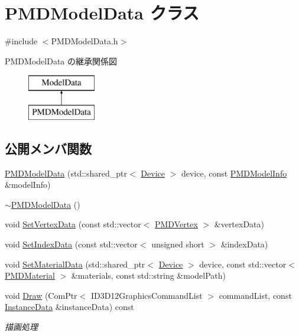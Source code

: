 \hypertarget{class_p_m_d_model_data}{}\section{P\+M\+D\+Model\+Data クラス}
\label{class_p_m_d_model_data}


{\ttfamily \#include $<$P\+M\+D\+Model\+Data.\+h$>$}

P\+M\+D\+Model\+Data の継承関係図\begin{figure}[H]
\begin{center}
\leavevmode
\includegraphics[height=2.000000cm]{class_p_m_d_model_data}
\end{center}
\end{figure}
\subsection*{公開メンバ関数}
\begin{DoxyCompactItemize}
\item 
\mbox{\hyperlink{class_p_m_d_model_data_a75af9f2a3f48724d2c4670cc4c117a0f}{P\+M\+D\+Model\+Data}} (std\+::shared\+\_\+ptr$<$ \mbox{\hyperlink{class_device}{Device}} $>$ device, const \mbox{\hyperlink{struct_p_m_d_model_info}{P\+M\+D\+Model\+Info}} \&model\+Info)
\item 
\mbox{\hyperlink{class_p_m_d_model_data_a5cc7bb8b8046d533f3d38f5e056cf627}{$\sim$\+P\+M\+D\+Model\+Data}} ()
\item 
void \mbox{\hyperlink{class_p_m_d_model_data_a7c3e55a09f65738c2117bdd7bb71b058}{Set\+Vertex\+Data}} (const std\+::vector$<$ \mbox{\hyperlink{struct_p_m_d_vertex}{P\+M\+D\+Vertex}} $>$ \&vertex\+Data)
\item 
void \mbox{\hyperlink{class_p_m_d_model_data_a120b4a461669a4bb68210602b17425f1}{Set\+Index\+Data}} (const std\+::vector$<$ unsigned short $>$ \&index\+Data)
\item 
void \mbox{\hyperlink{class_p_m_d_model_data_a83a950e111380bb2a28ecab045e5c3b4}{Set\+Material\+Data}} (std\+::shared\+\_\+ptr$<$ \mbox{\hyperlink{class_device}{Device}} $>$ device, const std\+::vector$<$ \mbox{\hyperlink{struct_p_m_d_material}{P\+M\+D\+Material}} $>$ \&materials, const std\+::string \&model\+Path)
\item 
void \mbox{\hyperlink{class_p_m_d_model_data_ae811d49854ae659f20ac9be60a5fb146}{Draw}} (Com\+Ptr$<$ I\+D3\+D12\+Graphics\+Command\+List $>$ command\+List, const \mbox{\hyperlink{struct_instance_data}{Instance\+Data}} \&instance\+Data) const
\begin{DoxyCompactList}\small\item\em 描画処理 \end{DoxyCompactList}\end{DoxyCompactItemize}
